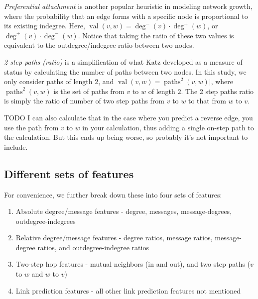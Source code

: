 \documentclass[conference]{IEEEtran}
\begin{document}
\emph{Preferential attachment} is another popular heuristic in modeling network growth, where the probability that an edge forms with a specific node is proportional to its existing indegree. Here, $\operatorname{val}(v,w) = \deg^-(v)\cdot \deg^+(w)$, or $\deg^+(v)\cdot \deg^-(w)$. Notice that taking the ratio of these two values is equivalent to the outdegree/indegree ratio between two nodes.

\emph{2 step paths (ratio)} is a simplification of what Katz \cite{Katz:1953un} developed as a measure of status by calculating the number of paths between two nodes. In this study, we only consider paths of length 2, and $\operatorname{val}(v,w) = \operatorname{paths}^2(v,w)|$, where $\operatorname{paths}^2(v,w)$ is the set of paths from $v$ to $w$ of length $2$. The 2 step paths ratio is simply the ratio of number of two step paths from $v$ to $w$ to that from $w$ to $v$. 

TODO I can also calculate that in the case where you predict a reverse edge, you use the path from $v$ to $w$ in your calculation, thus adding a single on-step path to the calculation. But this ends up being worse, so probably it's not important to include.

\subsection{Different sets of features}
For convenience, we further break down these into four sets of features:
\begin{enumerate}
	\item Absolute degree/message features - degree, messages, message-degrees, outdegree-indegrees
	\item Relative degree/message features - degree ratios, message ratios, message-degree ratios, and outdegree-indegree ratios
	\item Two-step hop features - mutual neighbors (in and out), and two step paths ($v$ to $w$ and $w$ to $v$)
	\item Link prediction features - all other link prediction features not mentioned
\end{enumerate}
\end{document}
